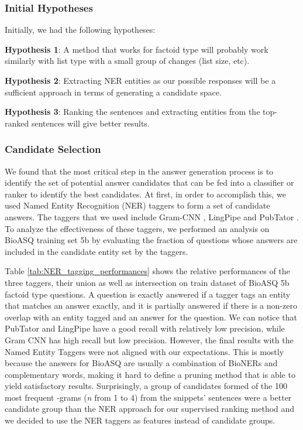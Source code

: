 \subsubsection{Initial Hypotheses}


Initially, we had the following hypotheses:

\bigbreak

\textbf{Hypothesis 1}: A method that works for factoid type will probably work similarly with list type with a small group of changes (list size, etc). 

\bigbreak 

\textbf{Hypothesis 2}: Extracting NER entities as our possible responses will be a sufficient approach in terms of generating a candidate space.

\bigbreak 

\textbf{Hypothesis 3}: Ranking the sentences and extracting entities from the top-ranked sentences will give better results.

\subsubsection{Candidate Selection}

We found that the most critical step in the answer generation process is to identify the set of potential answer candidates that can be fed into a classifier or ranker to identify the best candidates. At first, in order to accomplish this, we used Named Entity Recognition (NER) taggers to form a set of candidate answers. The taggers that we used include Gram-CNN \cite{gram-cnn}, LingPipe\cite{lingpipe} and PubTator \cite{pubtator}. To analyze the effectiveness of these taggers, we performed an analysis on BioASQ training set 5b by evaluating the fraction of questions whose answers are included in the candidate entity set by the taggers.

Table \ref{tab:NER_tagging_performances} shows the relative performances of the three taggers, their union as well as intersection on train dataset of BioASQ 5b factoid type questions. A question is exactly answered if a tagger tags an entity that matches an answer exactly, and it is partially answered if there is a non-zero overlap with an entity tagged and an answer for the question. We can notice that PubTator and LingPipe have a good recall with relatively low precision, while Gram CNN has high recall but low precision. However, the final results with the Named Entity Taggers were not aligned with our expectations. This is mostly because the answers for BioASQ are usually a combination of BioNERs and complementary words, making it hard to define a pruning method that is able to yield satisfactory results. Surprisingly, a group of candidates formed of the 100 most frequent -grams (\textit{n} from 1 to 4) from the snippets' sentences were a better candidate group than the NER approach for our supervised ranking method and we decided to use the NER taggers as features instead of candidate groups.


